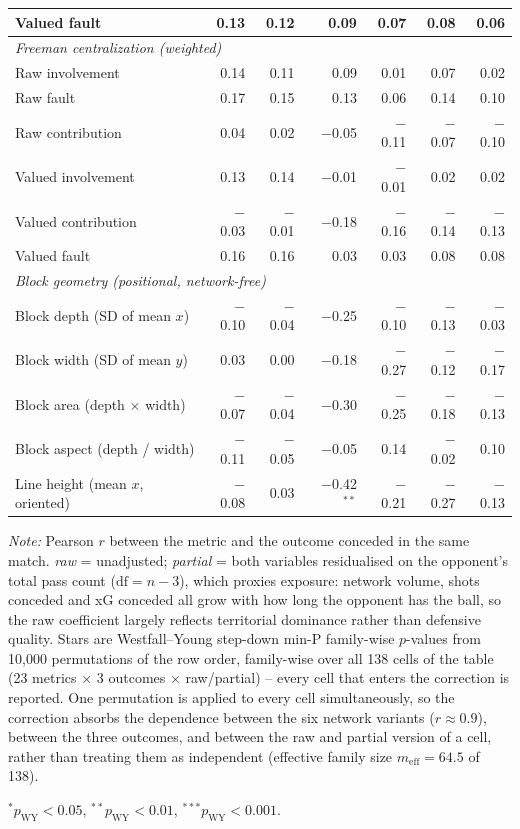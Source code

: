 \begin{table}[ht]
\begin{tabular}{lrrrrrr}
\quad Valued fault & 0.13 & 0.12 & 0.09 & 0.07 & 0.08 & 0.06 \\
\midrule
\multicolumn{7}{l}{\textit{Freeman centralization (weighted)}} \\
\quad Raw involvement & 0.14 & 0.11 & 0.09 & 0.01 & 0.07 & 0.02 \\
\quad Raw fault & 0.17 & 0.15 & 0.13 & 0.06 & 0.14 & 0.10 \\
\quad Raw contribution & 0.04 & 0.02 & $-$0.05 & $-$0.11 & $-$0.07 & $-$0.10 \\
\quad Valued involvement & 0.13 & 0.14 & $-$0.01 & $-$0.01 & 0.02 & 0.02 \\
\quad Valued contribution & $-$0.03 & $-$0.01 & $-$0.18 & $-$0.16 & $-$0.14 & $-$0.13 \\
\quad Valued fault & 0.16 & 0.16 & 0.03 & 0.03 & 0.08 & 0.08 \\
\midrule
\multicolumn{7}{l}{\textit{Block geometry (positional, network-free)}} \\
\quad Block depth (SD of mean $x$) & $-$0.10 & $-$0.04 & $-$0.25 & $-$0.10 & $-$0.13 & $-$0.03 \\
\quad Block width (SD of mean $y$) & 0.03 & 0.00 & $-$0.18 & $-$0.27 & $-$0.12 & $-$0.17 \\
\quad Block area (depth $\times$ width) & $-$0.07 & $-$0.04 & $-$0.30 & $-$0.25 & $-$0.18 & $-$0.13 \\
\quad Block aspect (depth / width) & $-$0.11 & $-$0.05 & $-$0.05 & 0.14 & $-$0.02 & 0.10 \\
\quad Line height (mean $x$, oriented) & $-$0.08 & 0.03 & $-$0.42$^{**}$ & $-$0.21 & $-$0.27 & $-$0.13 \\
\bottomrule
\end{tabular}

\vspace{0.9ex}
\begin{minipage}{0.96\linewidth}
\footnotesize
\textit{Note:} Pearson $r$ between the metric and the outcome conceded in the
same match. \textit{raw} = unadjusted; \textit{partial} = both variables
residualised on the opponent's total pass count ($\mathrm{df}=n-3$), which
proxies exposure: network volume, shots conceded and xG conceded all grow with
how long the opponent has the ball, so the raw coefficient largely reflects
territorial dominance rather than defensive quality.
Stars are Westfall--Young step-down min-P family-wise $p$-values from
10,000 permutations of the row order, family-wise over all 138
cells of the table (23 metrics $\times$ 3 outcomes
$\times$ raw/partial) -- every cell that enters the correction is reported. One
permutation is applied to every cell simultaneously, so the correction absorbs
the dependence between the six network variants ($r\approx0.9$), between the
three outcomes, and between the raw and partial version of a cell, rather than
treating them as independent (effective family size
$m_{\mathrm{eff}}=64.5$ of 138).
\par\smallskip
$^{*}p_{\mathrm{WY}}<0.05$, $^{**}p_{\mathrm{WY}}<0.01$, $^{***}p_{\mathrm{WY}}<0.001$.
\end{minipage}
\end{table}
